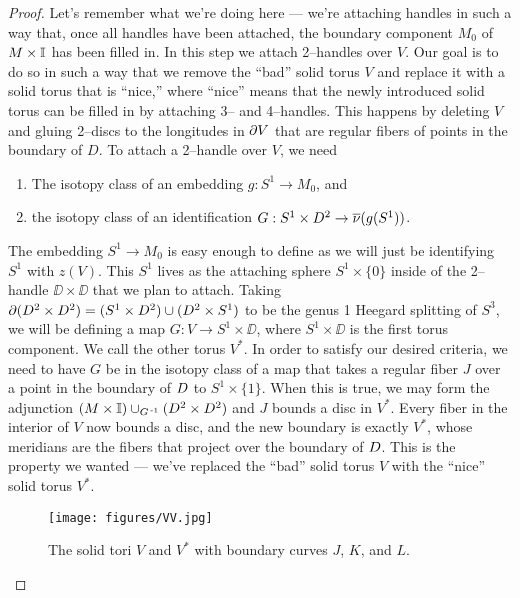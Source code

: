 \begin{proof}
	Let's remember what we're doing here --- we're attaching handles in such a way that, once all handles have been attached, the boundary component $M_0$ of $M\times\mathbb{I}$ has been filled in.
	In this step we attach 2--handles over $V$.
	Our goal is to do so in such a way that we remove the ``bad'' solid torus $V$ and replace it with a solid torus that is ``nice,'' where ``nice'' means that the newly introduced solid torus can be filled in by attaching 3-- and 4--handles.
	This happens by deleting $V$ and gluing 2--discs to the longitudes in $\partial V$ that are regular fibers of points in the boundary of $D$.
	To attach a 2--handle over $V$, we need
	\begin{enumerate}
		\item The isotopy class of an embedding $g:S^1\to M_0$, and
		\item the isotopy class of an identification $G:S^1\times D^2\to\overline{\nu}(g(S^1))$.
	\end{enumerate}
	The embedding $S^1\to M_0$ is easy enough to define as we will just be identifying $S^1$ with $z(V)$.
	This $S^1$ lives as the attaching sphere $S^1\times\{0\}$ inside of the 2--handle $\DD\times\DD$ that we plan to attach.
	Taking $\partial (D^2\times D^2)=(S^1\times D^2)\cup(D^2\times S^1)$ to be the genus 1 Heegard splitting of $S^3$, we will be defining a map $G:V\to S^1\times\DD$, where $S^1\times\DD$ is the first torus component.
	We call the other torus $V^*$.
	In order to satisfy our desired criteria, we need to have $G$ be in the isotopy class of a map that takes a regular fiber $J$ over a point in the boundary of $D$ to $S^1\times\{1\}$.
	When this is true, we may form the adjunction $(M\times\mathbb{I})\cup_{G^{\,\text{-}1}}(D^2\times D^2)$ and $J$ bounds a disc in $V^*$.
	Every fiber in the interior of $V$ now bounds a disc, and the new boundary is exactly $V^*$, whose meridians are the fibers that project over the boundary of $D$.
	This is the property we wanted --- we've replaced the ``bad'' solid torus $V$ with the ``nice'' solid torus $V^*$.
	
	\begin{figure}
		\centering
		\captionsetup{justification=centering}
		\caption{The solid tori $V$ and $V^*$ with boundary curves $J$, $K$, and $L$.}
		\texttt{[image: figures/VV.jpg]}
		\label{fig:VV*}
	\end{figure}
	

\end{proof}
